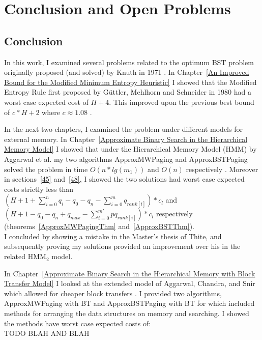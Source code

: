 \documentclass[letterpaper,12pt,titlepage,oneside,final]{book}
\theoremstyle{plain}
\begin{document}



\chapter{Conclusion and Open Problems} \label{Conclusion and Open Problems}

\section{Conclusion}

In this work, I examined several problems related to the optimum BST problem originally proposed (and solved) by Knuth in 1971 \cite{knuth1971optimum}. In Chapter~\ref{An Improved Bound for the Modified Minimum Entropy Heuristic} I showed that the Modified Entropy Rule first proposed by  G{\"u}ttler, Mehlhorn and Schneider in 1980 had a worst case expected cost of $H+4$. This improved upon the previous best bound of $c*H+2$ where $c \approx 1.08$ \cite{guttler1980binary}.

 In the next two chapters, I examined the problem under different models for external memory. In Chapter~\ref{Approximate Binary Search in the Hierarchical Memory Model} I showed that under the Hierarchical Memory Model (HMM) by Aggarwal et al. my two algorithms ApproxMWPaging and ApproxBSTPaging solved the problem in time $O(n*lg(m_1))$ and $O(n)$ respectively \cite{aggarwal1987model}. Moreover in sections~\ref{45} and~\ref{48}, I showed the two solutions had worst case expected costs strictly less than \\ $(H + 1 + \sum_{i=0}^n q_i - q_0 - q_n - \sum_{i=0}^m q_{rank[i]}) * c_l$ and \\
  $(H + 1 - q_0 - q_n + q_{max} - \sum_{i=0}^{m'} pq_{rank[i]})*c_l$ respectively (theorems~\ref{ApproxMWPagingThm} and~\ref{ApproxBSTThm}).\\
   I concluded by showing a mistake in the Master's thesis of Thite, and subsequently proving my solutions provided an improvement over his in the related HMM$_2$ model.
   
   In Chapter~\ref{Approximate Binary Search in the Hierarchical Memory with Block Transfer Model} I looked at the extended model of Aggarwal, Chandra, and Snir which allowed for cheaper block transfers \cite{aggarwal1987hierarchical}. I provided two algorithms, ApproxMWPaging with BT and ApproxBSTPaging with BT for which included methods for arranging the data structures on memory and searching. I showed the methods have worst case expected costs of: \\
   TODO BLAH AND BLAH 
\end{document}
